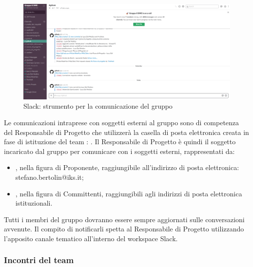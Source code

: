                     \begin{figure}[htbp]
                        \centering
                        \includegraphics[scale=0.25]{./img/slack.png}
                        \caption[Slack]{Slack: strumento per la comunicazione del gruppo}
                    \end{figure}

			 \label{comunicazione_esterna}

                Le comunicazioni intraprese con soggetti esterni al gruppo sono di competenza del Responsabile di Progetto
                che utilizzerà la casella di posta elettronica creata in fase di istituzione del team \GroupName{}: \GroupEmail{}.
                Il Responsabile di Progetto è quindi il soggetto incaricato dal gruppo per comunicare con i soggetti esterni,
                rappresentati da:

                    \begin{itemize}
                        \item \textbf{\Proponente{}}, nella figura di Proponente, raggiungibile all'indirizzo di posta elettronica: stefano.bertolin@iks.it;
                        \item \textbf{\Committenteinriga{}}, nella figura di Committenti, raggiungibili agli indirizzi di posta elettronica istituzionali.
                    \end{itemize}

                Tutti i membri del gruppo dovranno essere sempre aggiornati sulle conversazioni avvenute. Il compito
                di notificarli spetta al Responsabile di Progetto utilizzando l'apposito canale tematico all'interno del workspace Slack.

        \subsubsection{Incontri del team}

